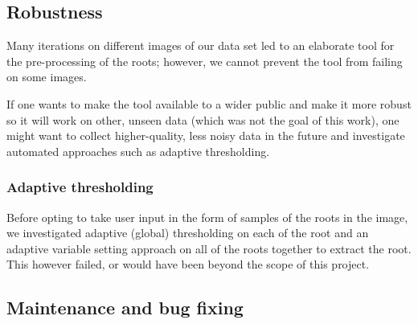  
\subsection{Robustness}



Many iterations on different images of our data set led to an elaborate tool for the pre-processing of the roots; however, we cannot prevent the tool from failing on some images. 

If one wants to make the tool available to a wider public and make it more robust so it will work on other, unseen data (which was not the goal of this work), one might want to collect higher-quality, less noisy data in the future and investigate automated approaches such as adaptive thresholding. 





\subsubsection{Adaptive thresholding}
Before opting to take user input in the form of samples of the roots in the image, we investigated adaptive (global) thresholding on each of the root and an adaptive variable setting approach on all of the roots together to extract the root. This however failed, or would have been beyond the scope of this project. %


\subsection{Maintenance and bug fixing}

